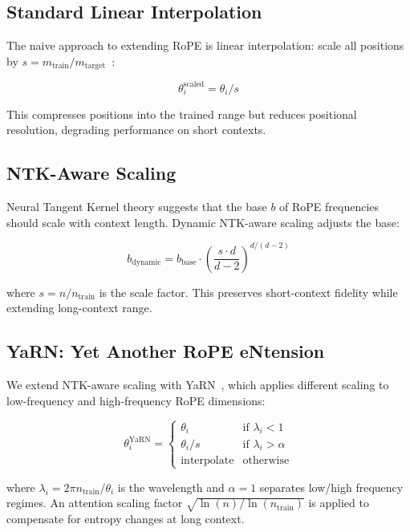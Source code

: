 \documentclass[11pt,a4paper]{article}
\begin{document}
\subsection{Standard Linear Interpolation}

The naive approach to extending RoPE is linear interpolation: scale all positions
by $s = m_\text{train}/m_\text{target}$~\cite{chen2023extending}:

\begin{equation}
\theta_i^{\text{scaled}} = \theta_i / s
\end{equation}

This compresses positions into the trained range but reduces positional resolution,
degrading performance on short contexts.

\subsection{NTK-Aware Scaling}

Neural Tangent Kernel theory suggests that the base $b$ of RoPE frequencies should
scale with context length. Dynamic NTK-aware scaling adjusts the base:

\begin{equation}
b_\text{dynamic} = b_\text{base} \cdot \left(\frac{s \cdot d}{d - 2}\right)^{d/(d-2)}
\end{equation}

where $s = n / n_\text{train}$ is the scale factor. This preserves short-context
fidelity while extending long-context range.

\subsection{YaRN: Yet Another RoPE eNtension}

We extend NTK-aware scaling with YaRN~\cite{peng2023yarn}, which applies different
scaling to low-frequency and high-frequency RoPE dimensions:

\begin{equation}
\theta_i^\text{YaRN} = \begin{cases} \theta_i & \text{if } \lambda_i < 1 \\ \theta_i / s & \text{if } \lambda_i > \alpha \\ \text{interpolate} & \text{otherwise} \end{cases}
\end{equation}

where $\lambda_i = 2\pi n_\text{train} / \theta_i$ is the wavelength and $\alpha = 1$
separates low/high frequency regimes. An attention scaling factor $\sqrt{\ln(n)/\ln(n_\text{train})}$
is applied to compensate for entropy changes at long context.
\end{document}
